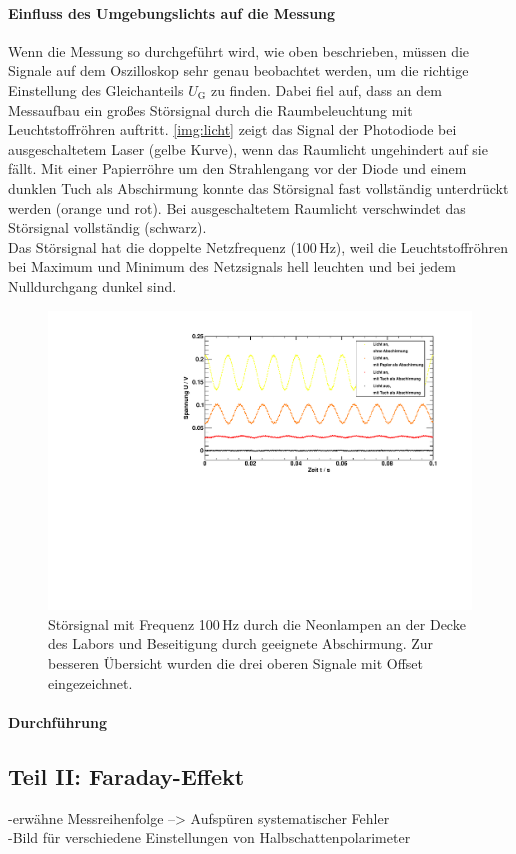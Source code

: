 \paragraph{Einfluss des Umgebungslichts auf die Messung}
Wenn die Messung so durchgeführt wird, wie oben beschrieben,
müssen die Signale auf dem Oszilloskop sehr genau beobachtet werden,
um die richtige Einstellung des Gleichanteils $U_{\text{G}}$ zu finden.
Dabei fiel auf, dass an dem Messaufbau ein großes Störsignal durch die Raumbeleuchtung
mit Leuchtstoffröhren auftritt.
\autoref{img:licht} zeigt das Signal der Photodiode bei ausgeschaltetem Laser (gelbe Kurve),
wenn das Raumlicht ungehindert auf sie fällt.
Mit einer Papierröhre um den Strahlengang vor der Diode und einem
dunklen Tuch als Abschirmung konnte das Störsignal fast vollständig unterdrückt werden (orange und rot).
Bei ausgeschaltetem Raumlicht verschwindet das Störsignal vollständig (schwarz).\\
Das Störsignal hat die doppelte Netzfrequenz (100\,Hz), weil die Leuchtstoffröhren bei Maximum und
Minimum des Netzsignals hell leuchten und bei jedem Nulldurchgang dunkel sind.

\begin{figure}[H]
\begin{center}
  \includegraphics[width=\textwidth]{../img/licht.pdf}
  \caption{Störsignal mit Frequenz 100\,Hz durch die Neonlampen an der Decke des Labors und
  Beseitigung durch geeignete Abschirmung.
  Zur besseren Übersicht wurden die drei oberen Signale mit Offset eingezeichnet. }
  \label{img:licht}
\end{center}
\end{figure}

\paragraph{Durchführung}


\subsection{Teil II: Faraday-Effekt}
-erwähne Messreihenfolge --> Aufspüren systematischer Fehler \\
-Bild für verschiedene Einstellungen von Halbschattenpolarimeter